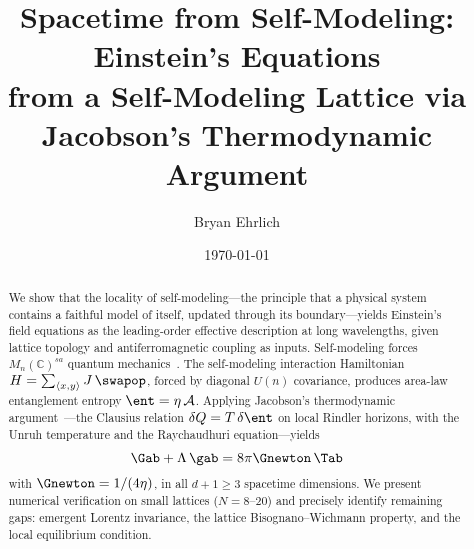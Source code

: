 \documentclass[aps,prd,twocolumn,superscriptaddress,nofootinbib]{revtex4-2}
\begin{document}
\title{Spacetime from Self-Modeling: Einstein's Equations\\from a Self-Modeling Lattice via Jacobson's Thermodynamic Argument}

\author{Bryan Ehrlich}

\date{\today}

\begin{abstract}
We show that the locality of self-modeling---the principle that a physical
system contains a faithful model of itself, updated through its
boundary---yields Einstein's field equations as the leading-order effective
description at long wavelengths, given lattice topology and
antiferromagnetic coupling as inputs. Self-modeling forces
$M_n(\mathbb{C})^{sa}$ quantum mechanics~\cite{Paper5}. The self-modeling
interaction Hamiltonian $H = \sum_{\langle x,y\rangle} J\, \swapop$,
forced by diagonal $U(n)$ covariance, produces area-law entanglement
entropy $\ent = \eta\,\mathcal{A}$. Applying Jacobson's thermodynamic
argument~\cite{Jacobson1995}---the Clausius relation
$\delta Q = T\,\delta\ent$ on local Rindler horizons, with the Unruh
temperature and the Raychaudhuri equation---yields
\begin{equation*}
  \Gab + \Lambda\, \gab = 8\pi \Gnewton\, \Tab
\end{equation*}
with $\Gnewton = 1/(4\eta)$, in all $d + 1 \geq 3$ spacetime dimensions.
We present numerical verification on small lattices ($N = 8$--$20$) and
precisely identify remaining gaps: emergent Lorentz invariance, the
lattice Bisognano--Wichmann property, and the local equilibrium condition.
\end{abstract}

\maketitle








\begin{acknowledgments}
\end{acknowledgments}


\end{document}
